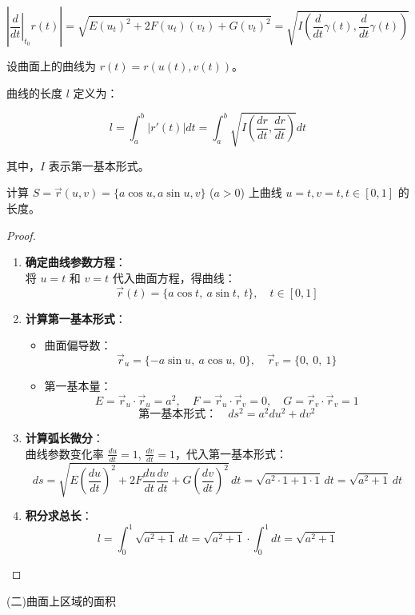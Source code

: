 \documentclass[lang=cn,10pt,thmcnt=section]{elegantbook}
\begin{document}
$$
\left| \left. \frac{d}{dt} \right|_{t_0} r(t) \right| = \sqrt{E (u_t)^2 + 2 F (u_t)(v_t) + G (v_t)^2} = \sqrt{I \left( \frac{d}{dt} \gamma(t), \frac{d}{dt} \gamma(t) \right)}
$$
\begin{definition}[曲线长度]
    设曲面上的曲线为 $r(t) = r(u(t), v(t))$。

    曲线的长度 $l$ 定义为：
    
    $$
    l = \int_{a}^{b} |r'(t)| dt = \int_{a}^{b} \sqrt{I\left(\frac{dr}{dt}, \frac{dr}{dt}\right)} dt
    $$
    
    其中，$I$ 表示第一基本形式。
    
\end{definition}
\begin{example}
	计算 $S = \vec{r}(u,v) = \{a\cos u, a\sin u, v\}$ ($a > 0$) 上曲线 $u = t, v = t, t \in [0,1]$ 的长度。
\end{example}
\begin{proof}
	\begin{enumerate}
		\item \textbf{确定曲线参数方程}：\\
		将 $u = t$ 和 $v = t$ 代入曲面方程，得曲线：
		\[
			\vec{r}(t) = \{a\cos t,\ a\sin t,\ t\}, \quad t \in [0,1]
		\]
		
		\item \textbf{计算第一基本形式}：
		\begin{itemize}
			\item 曲面偏导数：
			\[
				\vec{r}_u = \{-a\sin u,\ a\cos u,\ 0\}, \quad 
				\vec{r}_v = \{0,\ 0,\ 1\}
			\]
			\item 第一基本量：
			\[
				E = \vec{r}_u \cdot \vec{r}_u = a^2, \quad 
				F = \vec{r}_u \cdot \vec{r}_v = 0, \quad 
				G = \vec{r}_v \cdot \vec{r}_v = 1
			\]
			\[
				\text{第一基本形式：} \quad ds^2 = a^2 du^2 + dv^2
			\]
		\end{itemize}
		
		\item \textbf{计算弧长微分}：\\
		曲线参数变化率 $\frac{du}{dt} = 1$, $\frac{dv}{dt} = 1$，代入第一基本形式：
		\[
			ds = \sqrt{E\left(\frac{du}{dt}\right)^2 + 2F\frac{du}{dt}\frac{dv}{dt} + G\left(\frac{dv}{dt}\right)^2} \, dt = \sqrt{a^2 \cdot 1 + 1 \cdot 1} \, dt = \sqrt{a^2 + 1} \, dt
		\]
		
		\item \textbf{积分求总长}：
		\[
			l = \int_{0}^{1} \sqrt{a^2 + 1} \, dt = \sqrt{a^2 + 1} \cdot \int_{0}^{1} dt = \boxed{\sqrt{a^2 + 1}}
		\]
	\end{enumerate}
\end{proof}
(二)曲面上区域的面积
\end{document}
